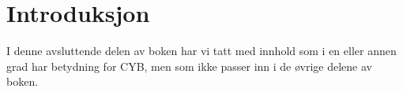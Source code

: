 \chapter*{Introduksjon}

I denne avsluttende delen av boken har vi tatt med innhold som i en eller annen grad har betydning for CYB, men som ikke passer inn i de øvrige delene av boken.
